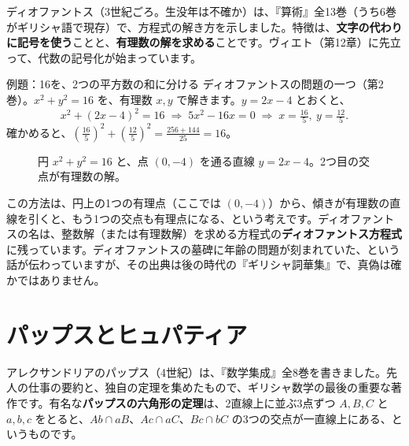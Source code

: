 \documentclass[a4paper,11pt,openany]{ltjsbook}
\begin{document}
ディオファントス（3世紀ごろ。生没年は不確か）は、『算術』全13巻（うち6巻がギリシャ語で現存）で、方程式の解き方を示しました。特徴は、\textbf{文字の代わりに記号を使う}ことと、\textbf{有理数の解を求める}ことです。ヴィエト（第12章）に先立って、代数の記号化が始まっています。

\begin{examplebox}{例題：16を、2つの平方数の和に分ける}
ディオファントスの問題の一つ（第2巻）。$x^2+y^2=16$ を、有理数 $x,y$ で解きます。$y=2x-4$ とおくと、
\[
x^2+(2x-4)^2=16\;\Longrightarrow\;5x^2-16x=0\;\Longrightarrow\;x=\tfrac{16}{5},\ y=\tfrac{12}{5}.
\]
確かめると、$\left(\tfrac{16}{5}\right)^2+\left(\tfrac{12}{5}\right)^2=\tfrac{256+144}{25}=16$。
\end{examplebox}

\begin{figure}[htbp]
\centering
{}
\caption{円 $x^2+y^2=16$ と、点 $(0,-4)$ を通る直線 $y=2x-4$。2つ目の交点が有理数の解。}
\end{figure}

この方法は、円上の1つの有理点（ここでは $(0,-4)$）から、傾きが有理数の直線を引くと、もう1つの交点も有理点になる、という考えです。ディオファントスの名は、整数解（または有理数解）を求める方程式の\textbf{ディオファントス方程式}に残っています。ディオファントスの墓碑に年齢の問題が刻まれていた、という話が伝わっていますが、その出典は後の時代の『ギリシャ詞華集』で、真偽は確かではありません。

\section{パップスとヒュパティア}

アレクサンドリアのパップス（4世紀）は、『数学集成』全8巻を書きました。先人の仕事の要約と、独自の定理を集めたもので、ギリシャ数学の最後の重要な著作です。有名な\textbf{パップスの六角形の定理}は、2直線上に並ぶ3点ずつ $A,B,C$ と $a,b,c$ をとると、$Ab\cap aB$、$Ac\cap aC$、$Bc\cap bC$ の3つの交点が一直線上にある、というものです。
\end{document}

